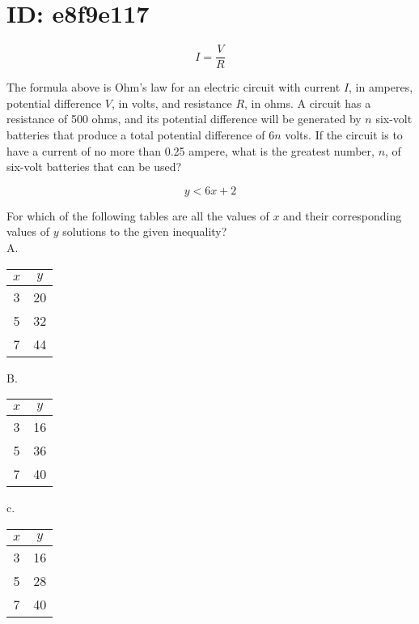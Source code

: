 \section*{ID: e8f9e117}
$$
I=\frac{V}{R}
$$

The formula above is Ohm's law for an electric circuit with current $I$, in amperes, potential difference $V$, in volts, and resistance $R$, in ohms. A circuit has a resistance of 500 ohms, and its potential difference will be generated by $n$ six-volt batteries that produce a total potential difference of $6 n$ volts. If the circuit is to have a current of no more than 0.25 ampere, what is the greatest number, $n$, of six-volt batteries that can be used?

$$
y<6 x+2
$$

For which of the following tables are all the values of $x$ and their corresponding values of $y$ solutions to the given inequality?\\
A.

\begin{center}
\begin{tabular}{|c|c|}
\hline
$x$ & $y$ \\
\hline
3 & 20 \\
\hline
5 & 32 \\
\hline
7 & 44 \\
\hline
\end{tabular}
\end{center}

B.

\begin{center}
\begin{tabular}{|c|c|}
\hline
$x$ & $y$ \\
\hline
3 & 16 \\
\hline
5 & 36 \\
\hline
7 & 40 \\
\hline
\end{tabular}
\end{center}

c.

\begin{center}
\begin{tabular}{|c|c|}
\hline
$x$ & $y$ \\
\hline
3 & 16 \\
\hline
5 & 28 \\
\hline
7 & 40 \\
\hline
\end{tabular}
\end{center}

